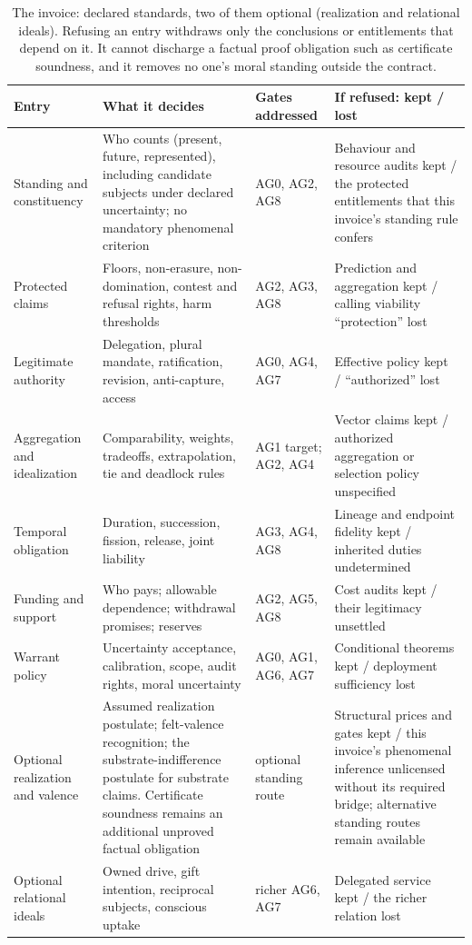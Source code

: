 \documentclass[pdflatex,sn-basic]{sn-jnl}%
\newcommand{\tablerows}{\renewcommand{\arraystretch}{1.6}}%
\begin{document}
\begin{table}[tbp]
  \centering\small
  \caption{The invoice: declared standards, two of them optional (realization and relational ideals). Refusing an entry withdraws only the conclusions or entitlements that depend on it. It cannot discharge a factual proof obligation such as certificate soundness, and it removes no one's moral standing outside the contract.}
  \label{tab:invoice}
  \tablerows
  \begin{tabularx}{\textwidth}{@{}>{\raggedright\arraybackslash}p{2.55cm}>{\raggedright\arraybackslash}X>{\raggedright\arraybackslash}p{2.15cm}>{\raggedright\arraybackslash}X@{}}
    \toprule
    Entry & What it decides & Gates addressed & If refused: kept / lost\\
    \midrule
    Standing and constituency & Who counts (present, future, represented), including candidate subjects under declared uncertainty; no mandatory phenomenal criterion & AG0, AG2, AG8 & Behaviour and resource audits kept / the protected entitlements that this invoice's standing rule confers\\
    Protected claims & Floors, non-erasure, non-domination, contest and refusal rights, harm thresholds & AG2, AG3, AG8 & Prediction and aggregation kept / calling viability ``protection'' lost\\
    Legitimate authority & Delegation, plural mandate, ratification, revision, anti-capture, access & AG0, AG4, AG7 & Effective policy kept / ``authorized'' lost\\
    Aggregation and idealization & Comparability, weights, tradeoffs, extrapolation, tie and deadlock rules & AG1 target; AG2, AG4 & Vector claims kept / authorized aggregation or selection policy unspecified\\
    Temporal obligation & Duration, succession, fission, release, joint liability & AG3, AG4, AG8 & Lineage and endpoint fidelity kept / inherited duties undetermined\\
    Funding and support & Who pays; allowable dependence; withdrawal promises; reserves & AG2, AG5, AG8 & Cost audits kept / their legitimacy unsettled\\
    Warrant policy & Uncertainty acceptance, calibration, scope, audit rights, moral uncertainty & AG0, AG1, AG6, AG7 & Conditional theorems kept / deployment sufficiency lost\\
    Optional realization and valence & Assumed realization postulate; felt-valence recognition; the substrate-indifference postulate for substrate claims. Certificate soundness remains an additional unproved factual obligation & optional standing route & Structural prices and gates kept / this invoice's phenomenal inference unlicensed without its required bridge; alternative standing routes remain available\\
    Optional relational ideals & Owned drive, gift intention, reciprocal subjects, conscious uptake & richer AG6, AG7 & Delegated service kept / the richer relation lost\\
    \bottomrule
  \end{tabularx}
\end{table}
\end{document}
